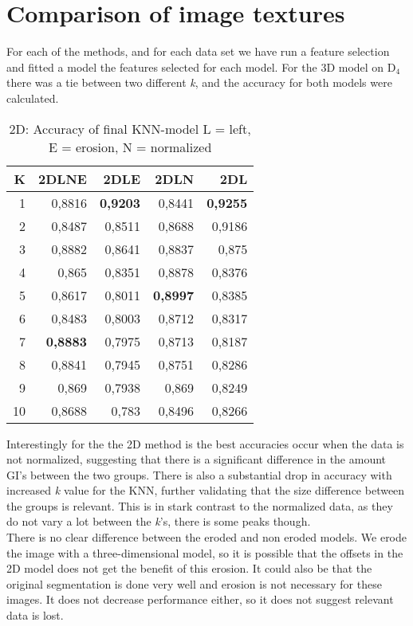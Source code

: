 \section{Comparison of image textures}
For each of the methods, and for each data set we have run a feature selection and fitted a model the features selected for each model. For the 3D model on D$_4$ there was a tie between two different \emph{k}, and the accuracy for both models were calculated.

\begin{table}[H]
  \centering
    \begin{tabular}{|r|r|r|r|r|}
    \hline
    K     & 2DLNE & 2DLE  & 2DLN  & 2DL \\ \hline
    1     & 0,8816 & \textbf{0,9203} & 0,8441 & \textbf{0,9255} \\ \hline
    2     & 0,8487 & 0,8511 & 0,8688 & 0,9186 \\ \hline
    3     & 0,8882 & 0,8641 & 0,8837 & 0,875 \\ \hline
    4     & 0,865 & 0,8351 & 0,8878 & 0,8376 \\ \hline
    5     & 0,8617 & 0,8011 & \textbf{0,8997} & 0,8385 \\ \hline
    6     & 0,8483 & 0,8003 & 0,8712 & 0,8317 \\ \hline
    7     & \textbf{0,8883} & 0,7975 & 0,8713 & 0,8187 \\ \hline
    8     & 0,8841 & 0,7945 & 0,8751 & 0,8286 \\ \hline
    9     & 0,869 & 0,7938 & 0,869 & 0,8249 \\ \hline
    10    & 0,8688 & 0,783 & 0,8496 & 0,8266 \\ \hline
    \end{tabular}%
  \caption{2D: Accuracy of final KNN-model L = left, E = erosion, N = normalized}\label{tab:2DFinalModel}%
\end{table}%

Interestingly for the the 2D method is the best accuracies occur when the data is not normalized, suggesting that there is a significant difference in the amount GI's between the two groups. There is also a substantial drop in accuracy with increased \emph{k} value for the KNN, further validating that the size difference between the groups is relevant. This is in stark contrast to the normalized data, as they do not vary a lot between the \emph{k}'s, there is some peaks though.\\
There is no clear difference between the eroded and non eroded models. We erode the image with a three-dimensional model, so it is possible that the offsets in the 2D model does not get the benefit of this erosion. It could also be that the original segmentation is done very well and erosion is not necessary for these images. It does not decrease performance either, so it does not suggest relevant data is lost.

